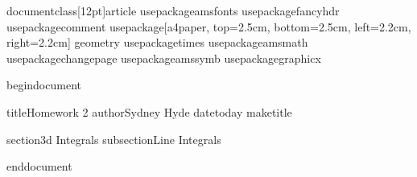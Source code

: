documentclass[12pt]{article}%
usepackage{amsfonts}
usepackage{fancyhdr}
usepackage{comment}
usepackage[a4paper, top=2.5cm, bottom=2.5cm, left=2.2cm, right=2.2cm]%
{geometry}
usepackage{times}
usepackage{amsmath}
usepackage{changepage}
usepackage{amssymb}
usepackage{graphicx}%

begin{document}

title{Homework 2}
author{Sydney Hyde}
date{today}
maketitle

section{3d Integrals}
subsection{Line Integrals} 

end{document}
